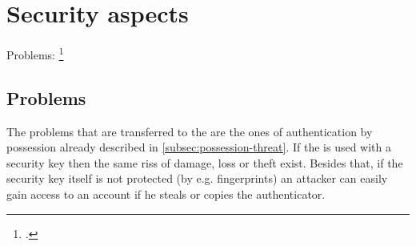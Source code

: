 \section{Security aspects}

Problems: \footcite{paragon-webauth}

\subsection{Problems}

The problems that are transferred to the \wa{} are the ones of authentication by possession already described in \autoref{subsec:possession-threat}. If the \wa{} is used with a security key then the same riss of damage, loss or theft exist. Besides that, if the security key itself is not protected (by e.g. fingerprints) an attacker can easily gain access to an account if he steals or copies the authenticator.
